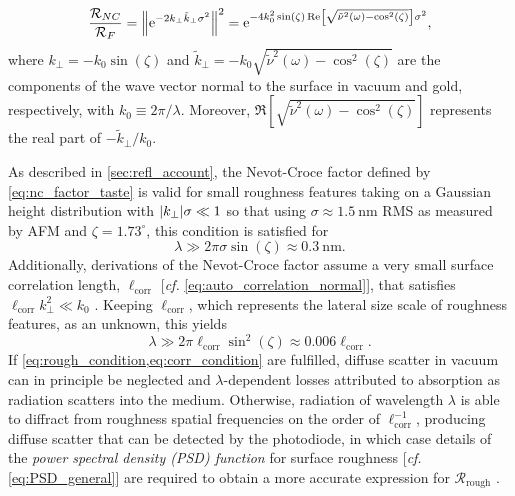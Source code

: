 \begin{equation}\label{eq:nc_factor_taste}
  \frac{\mathcal{R}_{NC}}{\mathcal{R}_F} = \norm{\mathrm{e}^{- 2 k_{\perp} \tilde{k}_{\perp} \sigma^2}}^2 = \mathrm{e}^{-4 k_0^2 \sin \left( \zeta \right) \Re \left[ \sqrt{\tilde{\nu}^2 (\omega) - \cos^2 \left( \zeta \right) } \right] \sigma^2} ,
 \end{equation}
where $k_{\perp} = - k_0 \sin \left( \zeta \right)$ and $\tilde{k}_{\perp} = -k_0 \sqrt{\tilde{\nu}^2 (\omega) - \cos^2 \left( \zeta \right)}$ are the components of the wave vector normal to the surface in vacuum and gold, respectively, with $k_0 \equiv 2 \pi / \lambda$. 
Moreover, $\Re \left[ \sqrt{\tilde{\nu}^2 (\omega) - \cos^2 \left( \zeta \right) } \right]$ represents the real part of $-\tilde{k}_{\perp} / k_0$. 

As described in \cref{sec:refl_account}, the Nevot-Croce factor defined by \cref{eq:nc_factor_taste} is valid for small roughness features taking on a Gaussian height distribution with $\abs{k_{\perp}} \sigma \ll 1$ so that using $\sigma \approx \SI{1.5}{\nm}$ RMS as measured by AFM and $\zeta = 1.73^{\circ}$, this condition is satisfied for  
\begin{equation}\label{eq:rough_condition}
 \lambda \gg 2 \pi \sigma \sin \left( \zeta \right) \approx \SI{0.3}{\nm}  .
 \end{equation}
Additionally, derivations of the Nevot-Croce factor assume a very small surface correlation length, $\ell_{\text{corr}}$ [\emph{cf.\@} \cref{eq:auto_correlation_normal}], that satisfies $\ell_{\text{corr}} k^2_{\perp} \ll k_0$ \cite{deBoer95}. 
Keeping $\ell_{\text{corr}}$, which represents the lateral size scale of roughness features, as an unknown, this yields 
\begin{equation}\label{eq:corr_condition}
 \lambda \gg 2 \pi \ell_{\text{corr}} \sin^2 \left( \zeta \right) \approx 0.006 \ell_{\text{corr}} . 
 \end{equation}
If \cref{eq:rough_condition,eq:corr_condition} are fulfilled, diffuse scatter in vacuum can in principle be neglected and $\lambda$-dependent losses attributed to absorption as radiation scatters into the medium. 
Otherwise, radiation of wavelength $\lambda$ is able to diffract from roughness spatial frequencies on the order of $\ell_{\text{corr}}^{-1}$, producing diffuse scatter that can be detected by the photodiode, in which case details of the \emph{power spectral density (PSD) function} for surface roughness [\emph{cf.\@} \cref{eq:PSD_general}] are required to obtain a more accurate expression for $\mathcal{R}_{\text{rough}}$ \cite{deBoer95,Wen15}. 


